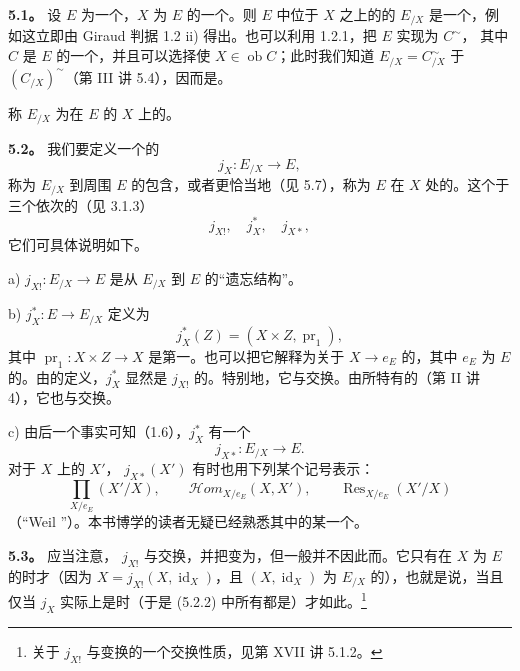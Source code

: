 \textbf{5.1。} 设 $E$ 为一个，$X$ 为 $E$ 的一个。则 $E$ 中位于 $X$ 之上的的 $E_{/X}$ 是一个，例如这立即由 Giraud 判据 1.2 ii) 得出。也可以利用 1.2.1，把 $E$ 实现为 $C^\sim$，
其中 $C$ 是 $E$ 的一个，并且可以选择使 $X\in\operatorname{ob}C$；此时我们知道 $E_{/X}=C^\sim_{/X}$ 于 $(C_{/X})^\sim$（第 III 讲 5.4），因而是。

称 $E_{/X}$ 为在 $E$ 的 $X$ 上的。

\textbf{5.2。} 我们要定义一个的
\[j_X:E_{/X}\longrightarrow E,\tag{5.2.1}\]
称为 $E_{/X}$ 到周围 $E$ 的包含，或者更恰当地（见 5.7），称为 $E$ 在 $X$ 处的。这个于三个依次的（见 3.1.3）
\[j_{X!},\quad j_X^*,\quad j_{X*},\tag{5.2.2}\]
它们可具体说明如下。

 a)  $j_{X!}:E_{/X}\to E$ 是从 $E_{/X}$ 到 $E$ 的“遗忘结构”。

 b)  $j_X^*:E\to E_{/X}$ 定义为
\[j_X^*(Z)=(X\times Z,\operatorname{pr}_1),\]
其中 $\operatorname{pr}_1:X\times Z\to X$ 是第一。也可以把它解释为关于 $X\to e_E$ 的，其中 $e_E$ 为 $E$ 的。由的定义，$j_X^*$ 显然是 $j_{X!}$ 的。特别地，它与交换。由所特有的（第 II 讲 4），它也与交换。

 c) 由后一个事实可知（1.6），$j_X^*$ 有一个
\[j_{X*}:E_{/X}\longrightarrow E.\]
对于 $X$ 上的 $X'$， $j_{X*}(X')$ 有时也用下列某个记号表示：
\[\prod_{X/e_E}(X'/X),\qquad \mathscr{H}om_{X/e_E}(X,X'),\qquad \operatorname{Res}_{X/e_E}(X'/X)\]
（“Weil ”）。本书博学的读者无疑已经熟悉其中的某一个。

\textbf{5.3。} 应当注意， $j_{X!}$ 与交换，并把变为，但一般并不因此而。它只有在 $X$ 为 $E$ 的时才（因为 $X=j_{X!}(X,\operatorname{id}_X)$，且 $(X,\operatorname{id}_X)$ 为 $E_{/X}$ 的），也就是说，当且仅当 $j_X$ 实际上是时（于是 (5.2.2) 中所有都是）才如此。\footnote{关于 $j_{X!}$ 与变换的一个交换性质，见第 XVII 讲 5.1.2。}

